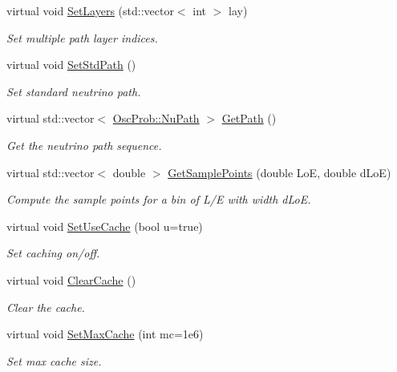 \begin{DoxyCompactItemize}
virtual void \hyperlink{classOscProb_1_1PMNS__Base_a904e580edf89fb98bf9a6397739b4ebe}{Set\+Layers} (std\+::vector$<$ int $>$ lay)
\begin{DoxyCompactList}\small\item\em Set multiple path layer indices. \end{DoxyCompactList}\item 
virtual void \hyperlink{classOscProb_1_1PMNS__Base_add6533a9fc9acdfc7ae258b62570d78d}{Set\+Std\+Path} ()
\begin{DoxyCompactList}\small\item\em Set standard neutrino path. \end{DoxyCompactList}\item 
virtual std\+::vector$<$ \hyperlink{structOscProb_1_1NuPath}{Osc\+Prob\+::\+Nu\+Path} $>$ \hyperlink{classOscProb_1_1PMNS__Base_ac8e196f2e85a2b1caaf705073ee95a5c}{Get\+Path} ()
\begin{DoxyCompactList}\small\item\em Get the neutrino path sequence. \end{DoxyCompactList}\item 
virtual std\+::vector$<$ double $>$ \hyperlink{classOscProb_1_1PMNS__Base_a9eac8d768c1424755ee41f7e783af179}{Get\+Sample\+Points} (double LoE, double d\+LoE)
\begin{DoxyCompactList}\small\item\em Compute the sample points for a bin of L/E with width d\+LoE. \end{DoxyCompactList}\item 
virtual void \hyperlink{classOscProb_1_1PMNS__Base_aa94c1e1fff0ba731c75f7e633b023a9f}{Set\+Use\+Cache} (bool u=true)
\begin{DoxyCompactList}\small\item\em Set caching on/off. \end{DoxyCompactList}\item 
virtual void \hyperlink{classOscProb_1_1PMNS__Base_ac47fd33e69aa6490f99e2fd147a92f03}{Clear\+Cache} ()
\begin{DoxyCompactList}\small\item\em Clear the cache. \end{DoxyCompactList}\item 
virtual void \hyperlink{classOscProb_1_1PMNS__Base_ae67862cf58b0802487a14b047b012a78}{Set\+Max\+Cache} (int mc=1e6)
\begin{DoxyCompactList}\small\item\em Set max cache size. \end{DoxyCompactList}\end{DoxyCompactItemize}
